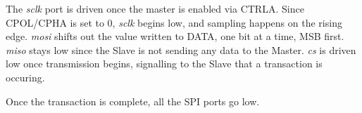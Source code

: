 The \textit{sclk} port is driven once the master is enabled via CTRLA. Since CPOL/CPHA is set to 0, \textit{sclk} begins low, and sampling happens on the rising edge.
\textit{mosi} shifts out the value written to DATA, one bit at a time, MSB first. \textit{miso} stays low since the Slave is not sending any data to the Master. \textit{cs} 
is driven low once transmission begins, signalling to the Slave that a transaction is occuring.

Once the transaction is complete, all the SPI ports go low. 


